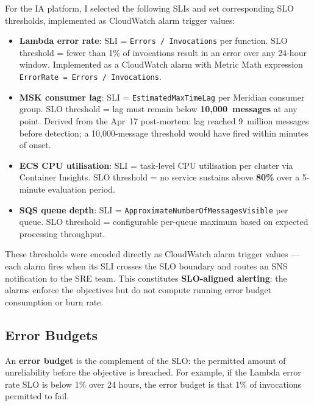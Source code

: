 For the IA platform, I selected the following SLIs and set corresponding
SLO thresholds, implemented as CloudWatch alarm trigger values:

\begin{itemize}
    \item \textbf{Lambda error rate}: SLI = \texttt{Errors / Invocations}
          per function. SLO threshold = fewer than 1\% of invocations
          result in an error over any 24-hour window. Implemented as a
          CloudWatch alarm with Metric Math expression
          \texttt{ErrorRate = Errors / Invocations}.

    \item \textbf{MSK consumer lag}: SLI = \texttt{EstimatedMaxTimeLag}
          per Meridian consumer group. SLO threshold = lag must remain
          below \textbf{10,000~messages} at any point. Derived from the
          Apr~17 post-mortem: lag reached 9~million messages before
          detection; a 10,000-message threshold would have fired within
          minutes of onset.

    \item \textbf{ECS CPU utilisation}: SLI = task-level CPU utilisation
          per cluster via Container Insights. SLO threshold = no service
          sustains above \textbf{80\%} over a 5-minute evaluation period.

    \item \textbf{SQS queue depth}: SLI = \texttt{ApproximateNumberOfMessagesVisible}
          per queue. SLO threshold = configurable per-queue maximum based
          on expected processing throughput.
\end{itemize}

These thresholds were encoded directly as CloudWatch alarm trigger
values --- each alarm fires when its SLI crosses the SLO boundary and
routes an SNS notification to the SRE team. This constitutes
\textbf{SLO-aligned alerting}: the alarms enforce the objectives but do
not compute running error budget consumption or burn rate.

\subsection{Error Budgets}

An \textbf{error budget} is the complement of the SLO: the permitted
amount of unreliability before the objective is breached. For example,
if the Lambda error rate SLO is below 1\% over 24 hours, the error
budget is that 1\% of invocations permitted to fail.

